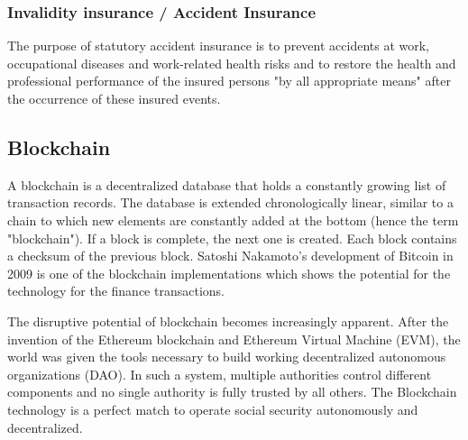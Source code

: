 \subsubsection*{Invalidity insurance / Accident Insurance}
The purpose of statutory accident insurance is to prevent accidents at work, occupational diseases and work-related health risks and to restore the health and professional performance of the insured persons "by all appropriate means" after the occurrence of these insured events.

\subsection{Blockchain}
A blockchain is a decentralized database that holds a constantly growing list of transaction records. The database is extended chronologically linear, similar to a chain to which new elements are constantly added at the bottom (hence the term "blockchain"). If a block is complete, the next one is created. Each block contains a checksum of the previous block. Satoshi Nakamoto's development of Bitcoin in 2009 is one of the blockchain implementations which shows the potential for the technology for the finance transactions. \cite{bitcoin}

The disruptive potential of blockchain becomes increasingly apparent. After the invention of the Ethereum blockchain and Ethereum Virtual Machine (EVM), the world was given the tools necessary to build working decentralized autonomous organizations (DAO). In such a system, multiple authorities control different components and no single authority is fully trusted by all others. \cite{cammarden} The Blockchain technology is a perfect match to operate social security autonomously and decentralized.

